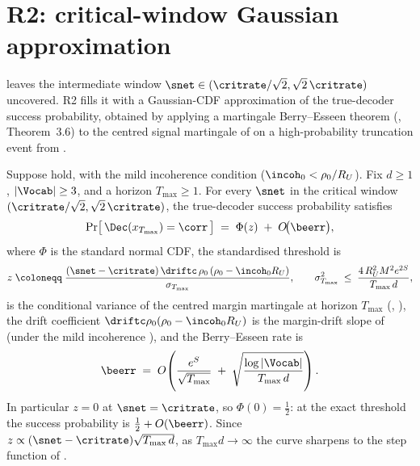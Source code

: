 \section{R2: critical-window Gaussian approximation}
\label{sec:R2}

 leaves the intermediate window
$\snet\in(\critrate/\sqrt2,\sqrt2\,\critrate)$ uncovered. R2 fills it with
a Gaussian-CDF approximation of the true-decoder success probability,
obtained by applying a martingale Berry--Esseen theorem
(\cite{hallheyde1980}, Theorem~3.6) to the centred signal martingale of
 on a high-probability truncation event from
.

\begin{theorem}
\label{thm:R2}
Suppose  hold, with the mild
incoherence condition  ($\incoh_0<\rho_0/R_U$). Fix
$d\ge1$, $|\Vocab|\ge3$, and a horizon $T_{\max}\ge1$. For every $\snet$ in
the critical window $(\critrate/\sqrt2,\sqrt2\,\critrate)$, the true-decoder
success probability satisfies
\begin{align}\label{eq:R2_phi}
   \Pr\bigl[\, \Dec(x_{T_{\max}})=\corr \,\bigr]
   \;=\;
   \Phi(z) \;+\; O\!\bigl(\beerr\bigr),
\end{align}
where $\Phi$ is the standard normal CDF, the standardised threshold is
\begin{align}\label{eq:R2_z}
   z
   \;\coloneqq\;
   \frac{(\snet-\critrate)\,\driftc\,\rho_0\,(\rho_0-\incoh_0 R_U)}{\sigma_{T_{\max}}},
   \qquad
   \sigma_{T_{\max}}^2 \;\le\; \frac{4\,R_U^2 M^2 e^{2S}}{T_{\max}\,d},
\end{align}
is the conditional variance of the centred margin martingale at horizon
$T_{\max}$ (, ), the drift
coefficient $\driftc\rho_0(\rho_0-\incoh_0 R_U)$ is the margin-drift slope
of  (under the mild incoherence ), and
the Berry--Esseen rate is
\begin{align}\label{eq:R2_eps}
   \beerr
   \;=\;
   O\!\left(
      \frac{e^{S}}{\sqrt{T_{\max}}}
      \;+\;
      \sqrt{\frac{\log|\Vocab|}{T_{\max}\,d}}
   \right).
\end{align}
In particular $z=0$ at $\snet=\critrate$, so $\Phi(0)=\tfrac12$: at the
exact threshold the success probability is $\tfrac12+O(\beerr)$. Since
$z\propto(\snet-\critrate)\sqrt{T_{\max}\,d}$, as $T_{\max}d\to\infty$ the
curve sharpens to the step function of .
\end{theorem}


